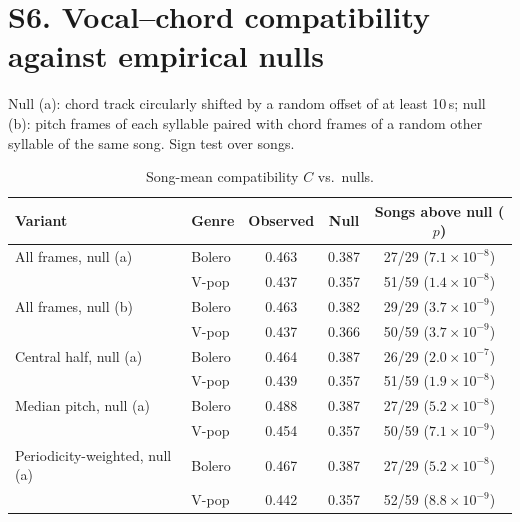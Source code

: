 \documentclass[11pt]{article}
\begin{document}
\section*{S6. Vocal--chord compatibility against empirical nulls}
Null (a): chord track circularly shifted by a random offset of at least 10\,s; null (b): pitch frames of each syllable paired with chord frames of a random other syllable of the same song. Sign test over songs.
\begin{table}[H]\centering\caption{Song-mean compatibility $C$ vs.\ nulls.}
\begin{tabular}{llccc}\toprule Variant & Genre & Observed & Null & Songs above null ($p$)\\\midrule
All frames, null (a) & Bolero & 0.463 & 0.387 & 27/29 ($7.1\times10^{-8}$)\\
 & V-pop & 0.437 & 0.357 & 51/59 ($1.4\times10^{-8}$)\\
All frames, null (b) & Bolero & 0.463 & 0.382 & 29/29 ($3.7\times10^{-9}$)\\
 & V-pop & 0.437 & 0.366 & 50/59 ($3.7\times10^{-9}$)\\
Central half, null (a) & Bolero & 0.464 & 0.387 & 26/29 ($2.0\times10^{-7}$)\\
 & V-pop & 0.439 & 0.357 & 51/59 ($1.9\times10^{-8}$)\\
Median pitch, null (a) & Bolero & 0.488 & 0.387 & 27/29 ($5.2\times10^{-8}$)\\
 & V-pop & 0.454 & 0.357 & 50/59 ($7.1\times10^{-9}$)\\
Periodicity-weighted, null (a) & Bolero & 0.467 & 0.387 & 27/29 ($5.2\times10^{-8}$)\\
 & V-pop & 0.442 & 0.357 & 52/59 ($8.8\times10^{-9}$)\\
\bottomrule\end{tabular}\end{table}
\end{document}
